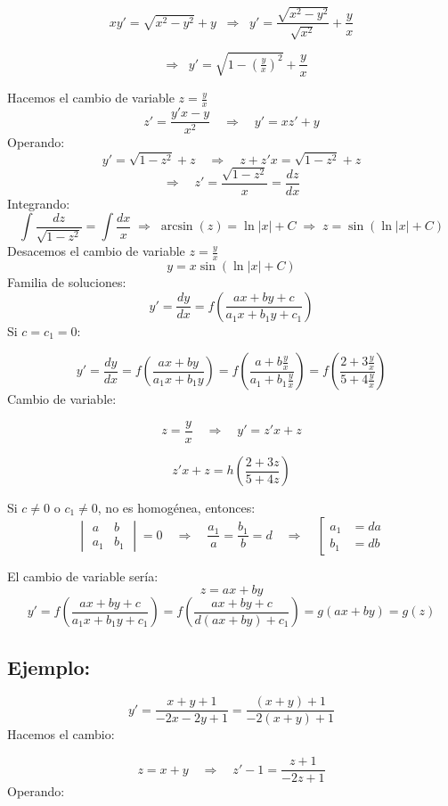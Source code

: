 \documentclass[a4paper,12pt]{article}
\begin{document}
\[
x y' = \sqrt{x^2 - y^2} + y 
\;\;\Rightarrow\;\;
y' = \frac{\sqrt{x^2 - y^2}}{\sqrt{x^2}} + \frac{y}{x}
\]

\[
\;\;\Rightarrow\;\; y' = \sqrt{1 - \left(\tfrac{y}{x}\right)^2} + \frac{y}{x}
\]

\newpage
\noindent
Hacemos el cambio de variable $z = \frac{y}{x}$
\[
z' = \frac{y'x - y}{x^2} \quad \Rightarrow \quad y' = x z' + y
\]
Operando:
\[
y' = \sqrt{1 - z^2} + z 
\quad \Rightarrow \quad 
z + z'x = \sqrt{1 - z^2} + z
\]
\[
\Rightarrow \quad z' = \frac{\sqrt{1-z^2}}{x} = \frac{dz}{dx}
\]
Integrando:
\[
\int \frac{dz}{\sqrt{1-z^2}} = \int \frac{dx}{x} \;\Rightarrow\; \arcsin(z) = \ln|x| + C \;\Rightarrow\; z = \sin(\ln|x| + C)
\]
Desacemos el cambio de variable $z = \frac{y}{x}$
\[
y = x \sin(\ln|x| + C)
\]
Familia de soluciones:
\[
y' = \frac{dy}{dx} = f\left( \frac{ax + by + c}{a_1 x + b_1 y + c_1} \right)
\]
Si \( c = c_1 = 0 \):

\[
y' = \frac{dy}{dx} = f\left( \frac{ax + by}{a_1 x + b_1 y} \right) =
f\left( \frac{a + b \frac{y}{x}}{a_1 + b_1 \frac{y}{x}} \right) = 
f\left( \frac{2 + 3 \frac{y}{x}}{5 + 4 \frac{y}{x}} \right)
\]
Cambio de variable:

\[
z = \frac{y}{x} \quad \Rightarrow \quad y' = z' x + z
\]

\[
z'x + z = h\left( \frac{2 + 3z}{5 + 4z} \right)
\]

\medskip
\noindent
Si \( c \neq 0 \) o \( c_1 \neq 0 \), no es homogénea, entonces:
\[
\begin{vmatrix}
a & b \\
a_1 & b_1
\end{vmatrix} = 0
\quad \Rightarrow \quad
\frac{a_1}{a} = \frac{b_1}{b} = d
\quad \Rightarrow \quad
\left[
\begin{aligned}
a_1 &= da \\[6pt]
b_1 &= db
\end{aligned}
\right.
\]

\newpage
\noindent
El cambio de variable sería:
\[
z = ax + by
\]
\[
y' = f\left( \frac{ax + by + c}{a_1 x + b_1 y + c_1} \right) = f\left( \frac{ax + by + c}{d(ax + by) + c_1} \right) = g(ax + by) = g(z)
\]

\subsection*{Ejemplo:}
\[
y' = \frac{x + y + 1}{-2x - 2y + 1} = \frac{(x + y) + 1}{-2(x + y) + 1}
\]
Hacemos el cambio:

\[
z = x + y
\quad \Rightarrow \quad
z' - 1 = \frac{z + 1}{-2z + 1}
\]
Operando:
\end{document}
